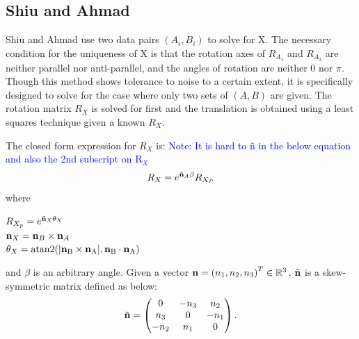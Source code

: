 \documentclass[twocolumn,10pt]{asme2ej}
\newcommand{\nn}{{\bf n}}
\begin{document}
\subsection{Shiu and Ahmad }
Shiu and Ahmad \cite{shiu1987finding,shiu1989calibration} use two data pairs $(A_{i}, B_{i})$ to solve for X. The necessary condition for the uniqueness of X is that the rotation axes of $R_{A_1}$ and $R_{A_2}$ are neither parallel nor anti-parallel, and the angles of rotation are neither 0 nor $\pi$. Though this method shows tolerance to noise to a certain extent, it is specifically designed to solve for the case where only two sets of $(A, B)$ are given. 
The rotation matrix $R_{X}$ is solved for first and the translation is obtained using a least squares technique given a known $R_{X}$.

The closed form expression for $R_{X}$ is:
\textcolor{blue}{Note: It is hard to \~n in the below equation and also the 2nd subscript on R$_X$}
\begin{equation}
R_{X} = e^{\tilde{\nn}_{A}\beta}R_{X_{P}}
\label{RotationCheng}
\end{equation}
where 
\begin{center}
$R_{X_{p}} =  e^{\tilde{\nn}_{X}\theta_{X}}$\\
$\nn_{X} = \nn_{B} \times \nn_{A}$\\
$\theta_{X} = \rm atan2(|\nn_{B} \times \nn_{A}|,\nn_{B} \cdot \nn_{A})$\\
\end{center}
and $\beta$ is an arbitrary angle. Given a vector $\nn = \left( n_{1}, n_{2}, n_{3} \right)^{T} \in \mathbb{R}^{3}$, $\tilde{\nn}$ is a skew-symmetric matrix defined as below:\\
\begin{equation}
\tilde{\nn}
=
\begin{pmatrix}
0 & -n_{3} & n_{2} \\
n_{3} & 0 & -n_{1} \\
-n_{2} & n_{1} & 0
\end{pmatrix}.
\end{equation}
\end{document}
